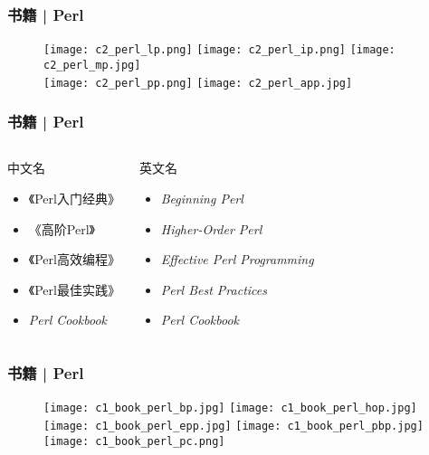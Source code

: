 \begin{frame}
  \frametitle{书籍 | Perl}
  \begin{figure}
    \centering
    \texttt{[image: c2\_perl\_lp.png]}
    \qquad
    \texttt{[image: c2\_perl\_ip.png]}
    \qquad
    \texttt{[image: c2\_perl\_mp.jpg]}\\
    \texttt{[image: c2\_perl\_pp.png]}
    \hspace{2cm}
    \texttt{[image: c2\_perl\_app.jpg]}
  \end{figure}
\end{frame}

\begin{frame}
  \frametitle{书籍 | Perl}
  \begin{columns}
  \begin{block}{中文名}
    \begin{itemize}
      \item \alert{《Perl入门经典》}
      \item 《高阶Perl》
      \item 《Perl高效编程》
      \item 《Perl最佳实践》
      \item \textit{Perl Cookbook}
    \end{itemize}
  \end{block}
  \begin{block}{英文名}
    \begin{itemize}
      \item \textit{Beginning Perl}
      \item \textit{Higher-Order Perl}
      \item \textit{Effective Perl Programming}
      \item \textit{Perl Best Practices}
      \item \textit{Perl Cookbook}
    \end{itemize}
  \end{block}
\end{columns}
\end{frame}

\begin{frame}
  \frametitle{书籍 | Perl}
  \begin{figure}
    \centering
    \texttt{[image: c1\_book\_perl\_bp.jpg]}\qquad
    \texttt{[image: c1\_book\_perl\_hop.jpg]}\\
    \texttt{[image: c1\_book\_perl\_epp.jpg]}\quad
    \texttt{[image: c1\_book\_perl\_pbp.jpg]}\quad
    \texttt{[image: c1\_book\_perl\_pc.png]}
  \end{figure}
\end{frame}

